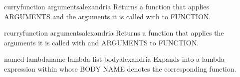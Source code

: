 \begin{function}{curry}{function \rest arguments}{alexandria}{}
  Returns a function that applies ARGUMENTS and the arguments
it is called with to FUNCTION.
\end{function}

\begin{function}{rcurry}{function \rest arguments}{alexandria}{}
  Returns a function that applies the arguments it is called
with and ARGUMENTS to FUNCTION.
\end{function}

\begin{macro}{named-lambda}{name lambda-list \body body}{alexandria}{}
  Expands into a lambda-expression within whose BODY NAME denotes the
corresponding function.
\end{macro}
